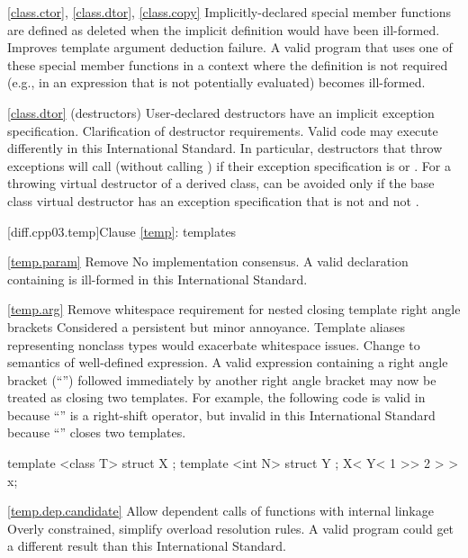 \ref{class.ctor}, \ref{class.dtor}, \ref{class.copy}
\change Implicitly-declared special member functions are defined as deleted
when the implicit definition would have been ill-formed.
\rationale Improves template argument deduction failure.
\effect
A valid \CppIII program that uses one of these special member functions in a
context where the definition is not required (e.g., in an expression that is
not potentially evaluated) becomes ill-formed.

\ref{class.dtor} (destructors)
\change User-declared destructors have an implicit exception specification.
\rationale Clarification of destructor requirements.
\effect
Valid \CppIII code may execute differently in this International Standard. In
particular, destructors that throw exceptions will call 
(without calling ) if their exception specification is
 or . For a throwing virtual destructor
of a derived class,  can be avoided only if the base class
virtual destructor has an exception specification that is not 
and not .

[diff.cpp03.temp]{Clause \ref{temp}: templates}

\ref{temp.param}
\change Remove 
\rationale No implementation consensus.
\effect
A valid \CppIII declaration containing  is ill-formed in this
International Standard.

\ref{temp.arg}
\change Remove whitespace requirement for nested closing template right angle
brackets
\rationale Considered a persistent but minor annoyance. Template aliases
representing nonclass types would exacerbate whitespace issues.
\effect
Change to semantics of well-defined expression. A valid \CppIII expression
containing a right angle bracket (``\tcode{>}'') followed immediately by
another right angle bracket may now be treated as closing two templates.
For example, the following code is valid in \CppIII because ``\tcode{\shr}''
is a right-shift operator, but invalid in this International Standard because
``\tcode{\shr}'' closes two templates.

\begin{codeblock}
template <class T> struct X { };
template <int N> struct Y { };
X< Y< 1 >> 2 > > x;
\end{codeblock}

\ref{temp.dep.candidate}
\change Allow dependent calls of functions with internal linkage
\rationale Overly constrained, simplify overload resolution rules.
\effect
A valid \CppIII program could get a different result than this
International Standard.

